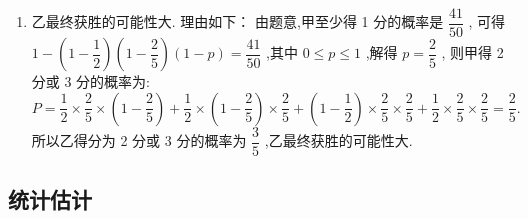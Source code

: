 \begin{enumerate}
\begin{jieda}
\begin{enumerate}
            故所求概率为 $P = \dfrac{{30} + {12}}{56} = \dfrac{3}{4}$ .
            \item 乙最终获胜的可能性大. 理由如下：
            由题意,甲至少得 1 分的概率是 $\dfrac{41}{50}$ ,
            可得 $1 - \left( {1 - \dfrac{1}{2}}\right) \left( {1 - \dfrac{2}{5}}\right) \left( {1 - p}\right)  = \dfrac{41}{50}$ ,其中 $0 \leq  p \leq  1$ ,解得 $p = \dfrac{2}{5}$ ,
            则甲得 2 分或 3 分的概率为:
            $P = \dfrac{1}{2} \times  \dfrac{2}{5} \times  \left( {1 - \dfrac{2}{5}}\right)  + \dfrac{1}{2} \times  \left( {1 - \dfrac{2}{5}}\right)  \times  \dfrac{2}{5} + \left( {1 - \dfrac{1}{2}}\right)  \times  \dfrac{2}{5} \times  \dfrac{2}{5} + \dfrac{1}{2} \times  \dfrac{2}{5} \times  \dfrac{2}{5} = \dfrac{2}{5}.$
            所以乙得分为 2 分或 3 分的概率为 $\dfrac{3}{5}$ ,乙最终获胜的可能性大.
        \end{enumerate}
    \end{jieda}
\end{enumerate}
\clearpage
\subsection*{统计估计}

